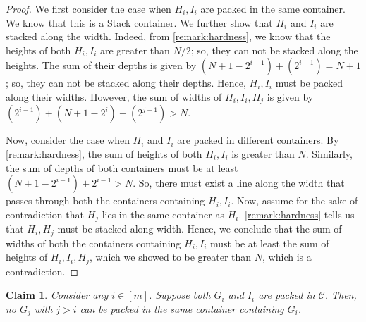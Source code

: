 \documentclass[10pt,a4paper]{amsart}
\newtheorem{claim}[theorem]{Claim}
\theoremstyle{definition}
\begin{document}
\begin{proof}
    We first consider the case when $H_i,I_i$ are packed in the same container.
    We know that this is a Stack container. We further show that $H_i$ and $I_i$ are stacked along the width.
    Indeed, from \cref{remark:hardness}, we know that the heights of both $H_i,I_i$ are greater than $N/2$; so, they can not be stacked along the heights. The sum of their depths is given by $(N+1-2^{i-1})+(2^{i-1})=N+1$; so, they can not be stacked along their depths. Hence, $H_i,I_i$ must be packed along their widths. However, the sum of widths of $H_i,I_i,H_j$ is given by $(2^{i-1})+(N+1-2^{i})+(2^{j-1})>N$.

    Now, consider the case when $H_i$ and $I_i$ are packed in different containers.
    By \cref{remark:hardness}, the sum of heights of both $H_i,I_i$ is greater than $N$. Similarly, the sum of depths of both containers must be at least $(N+1-2^{i-1})+2^{i-1}>N$.
    So, there must exist a line along the width that passes through both the containers containing $H_i,I_i$.
    Now, assume for the sake of contradiction that $H_j$ lies in the same container as $H_i$. \cref{remark:hardness} tells us that $H_i,H_j$ must be stacked along width.
    Hence, we conclude that the sum of widths of both the containers containing $H_i,I_i$ must be at least the sum of heights of $H_i,I_i,H_j$, which we showed to be greater than $N$,
    which is a contradiction.
\end{proof}
\begin{claim}
\label{lem:gig}
    Consider any $i\in[m]$. Suppose both $G_i$ and $I_i$ are packed in $\mathcal C$. Then, no $G_j$ with $j>i$ can be packed in the same container containing $G_i$.
\end{claim}
\end{document}
